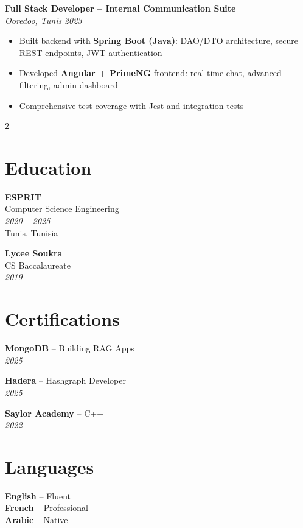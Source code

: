 \documentclass[10pt,a4paper]{article}
\begin{document}
{\vspace{3pt}
\textbf{Full Stack Developer -- Internal Communication Suite}\\[1pt]
\textit{Ooredoo, Tunis} \hfill \textit{2023}
\begin{itemize}[leftmargin=12pt,itemsep=1pt,topsep=1pt,parsep=0pt]
  \item Built backend with \textbf{Spring Boot (Java)}: DAO/DTO architecture, secure REST endpoints, JWT authentication
  \item Developed \textbf{Angular + PrimeNG} frontend: real-time chat, advanced filtering, admin dashboard
  \item Comprehensive test coverage with Jest and integration tests
\end{itemize}

}

\vspace{3pt}
\begin{multicols}{2}

\section*{Education}
\vspace{2pt}
{\small
\textbf{ESPRIT}\\[1pt]
Computer Science Engineering\\[1pt]
\textit{2020 -- 2025}\\[1pt]
Tunis, Tunisia

\vspace{3pt}
\textbf{Lycee Soukra}\\[1pt]
CS Baccalaureate\\[1pt]
\textit{2019}
}

\vspace{3pt}
\section*{Certifications}
\vspace{2pt}
{\small
\textbf{MongoDB} -- Building RAG Apps\\[1pt]
\textit{2025}

\vspace{2pt}
\textbf{Hadera} -- Hashgraph Developer\\[1pt]
\textit{2025}

\vspace{2pt}
\textbf{Saylor Academy} -- C++\\[1pt]
\textit{2022}
}

\columnbreak

\section*{Languages}
\vspace{2pt}
{\small
\textbf{English} -- Fluent\\[2pt]
\textbf{French} -- Professional\\[2pt]
\textbf{Arabic} -- Native
}

\end{multicols}
\end{document}
